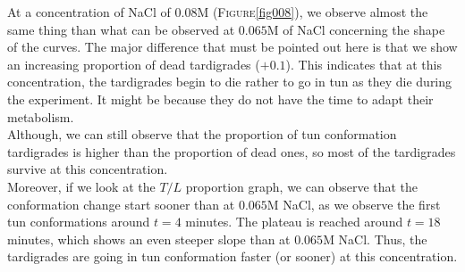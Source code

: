 \documentclass[12pt,a4paper, twocolumn]{article}
\begin{document}
At a concentration of NaCl of $0.08$M (\textsc{Figure}\ref{fig008}), we observe almost the same thing than what can be observed at $0.065$M of NaCl concerning the shape of the curves. The major difference that must be pointed out here is that we show an increasing proportion of dead tardigrades ($+0.1$). This indicates that at this concentration, the tardigrades begin to die rather to go in tun as they die during the experiment. It might be because they do not have the time to adapt their metabolism. \\
Although, we can still observe that the proportion of tun conformation tardigrades is higher than the proportion of dead ones, so most of the tardigrades survive at this concentration.\\
Moreover, if we look at the $T/L$ proportion graph, we can observe that the conformation change start sooner than at $0.065$M NaCl, as we observe the first tun conformations around $t=4$ minutes. The plateau is reached around $t=18$ minutes, which shows an even steeper slope than at $0.065$M NaCl. Thus, the tardigrades are going in tun conformation faster (or sooner) at this concentration. 
\end{document}
